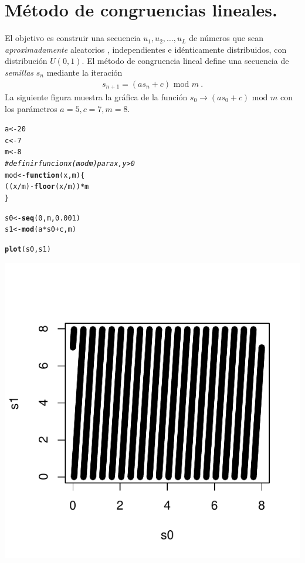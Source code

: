 \documentclass[12pt,reqno]{amsart}\usepackage[]{graphicx}\usepackage[]{color}
\makeatletter
\newcommand{\hlnum}[1]{\textcolor[rgb]{0.686,0.059,0.569}{#1}}%
\newcommand{\hlcom}[1]{\textcolor[rgb]{0.678,0.584,0.686}{\textit{#1}}}%
\newcommand{\hlopt}[1]{\textcolor[rgb]{0,0,0}{#1}}%
\newcommand{\hlstd}[1]{\textcolor[rgb]{0.345,0.345,0.345}{#1}}%
\newcommand{\hlkwa}[1]{\textcolor[rgb]{0.161,0.373,0.58}{\textbf{#1}}}%
\newcommand{\hlkwb}[1]{\textcolor[rgb]{0.69,0.353,0.396}{#1}}%
\newcommand{\hlkwc}[1]{\textcolor[rgb]{0.333,0.667,0.333}{#1}}%
\newcommand{\hlkwd}[1]{\textcolor[rgb]{0.737,0.353,0.396}{\textbf{#1}}}%
\newenvironment{kframe}{%
 \def\at@end@of@kframe{}%
 \ifinner\ifhmode%
  \def\at@end@of@kframe{\end{minipage}}%
  \begin{minipage}{\columnwidth}%
 \fi\fi%
 \def\FrameCommand##1{\hskip\@totalleftmargin \hskip-\fboxsep
 \colorbox{shadecolor}{##1}\hskip-\fboxsep
     \hskip-\linewidth \hskip-\@totalleftmargin \hskip\columnwidth}%
 \MakeFramed {\advance\hsize-\width
   \@totalleftmargin\z@ \linewidth\hsize
   \@setminipage}}%
 {\par\unskip\endMakeFramed%
 \at@end@of@kframe}
\newenvironment{knitrout}{}{} %
\makeatother
\begin{document}
\section{Método de congruencias lineales.}
El objetivo es construir una secuencia $u_{1},u_2,\ldots, u_L$ de números que sean \emph{aproximadamente} aleatorios , independientes e idénticamente distribuidos, con distribución $U(0,1)$. El método de congruencia lineal define una secuencia de \emph{semillas} $s_n$ mediante la iteración
\begin{equation*}
	\begin{split}
	s_{n+1} = (a s_n + c) \text{ mod } m \:.
	\end{split}
\end{equation*}
La siguiente figura muestra la gráfica de la función $s_0\to  (a s_0 + c) \text{ mod } m$ con los parámetros $a =5 , c = 7 , m = 8$.
\begin{knitrout}
\color{fgcolor}\begin{kframe}
\begin{alltt}
\hlstd{a} \hlkwb{<-} \hlnum{20}
\hlstd{c} \hlkwb{<-} \hlnum{7}
\hlstd{m} \hlkwb{<-} \hlnum{8}
\hlcom{# definir funcion x (mod m) para x,y > 0}
\hlstd{mod} \hlkwb{<-} \hlkwa{function}\hlstd{(}\hlkwc{x}\hlstd{,} \hlkwc{m}\hlstd{) \{}
    \hlstd{((x}\hlopt{/}\hlstd{m)} \hlopt{-} \hlkwd{floor}\hlstd{(x}\hlopt{/}\hlstd{m))} \hlopt{*} \hlstd{m}
\hlstd{\}}

\hlstd{s0} \hlkwb{<-} \hlkwd{seq}\hlstd{(}\hlnum{0}\hlstd{, m,} \hlnum{0.001}\hlstd{)}
\hlstd{s1} \hlkwb{<-} \hlkwd{mod}\hlstd{(a} \hlopt{*} \hlstd{s0} \hlopt{+} \hlstd{c, m)}
\end{alltt}
\end{kframe}
\end{knitrout}

\begin{knitrout}
\color{fgcolor}\begin{kframe}
\begin{alltt}
\hlkwd{plot}\hlstd{( s0 , s1 )}
\end{alltt}
\end{kframe}
\includegraphics[width=.45\linewidth]{figure/iteracion2_} 

\end{knitrout}
\end{document}
